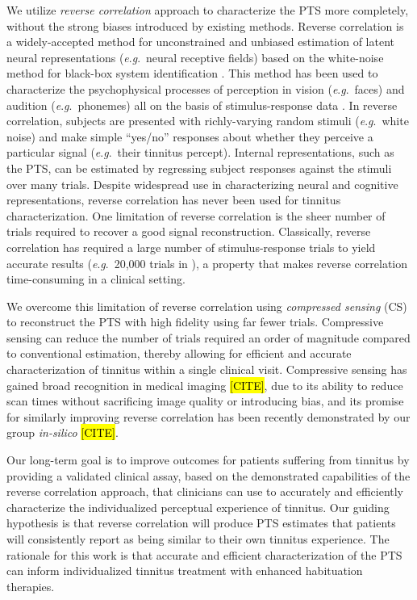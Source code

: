 \documentclass[journal]{IEEEtran}
\newcommand{\eg}{\textit{e}.\textit{g}.\ }
\begin{document}
We utilize \textit{reverse correlation} approach to characterize the PTS more completely,
without the strong biases introduced by existing methods.
Reverse correlation is a widely-accepted method for unconstrained and unbiased estimation
of latent neural representations (\eg neural receptive fields)
based on the white-noise method for black-box system identification
\cite{ringachReverseCorrelationNeurophysiology2004,ljungMeasureLackFit1978}.
This method has been used to characterize the psychophysical processes of perception
in vision (\eg faces) and audition (\eg phonemes)
\cite{ahumadaStimulusFeaturesSignal1971,gosselinSuperstitiousPerceptionsReveal2003,brimijoinInternalRepresentationVowel2013}
all on the basis of stimulus-response data
\cite{marmarelisWhiteNoiseMethodSystem1978,neriReceptivePerceptiveFields2006}.
In reverse correlation, subjects are presented with richly-varying random stimuli (\eg white noise)
and make simple ``yes/no'' responses about whether they perceive a particular signal
(\eg their tinnitus percept).
Internal representations, such as the PTS, can be estimated
by regressing subject responses against the stimuli over many trials.
Despite widespread use in characterizing neural and cognitive representations,
reverse correlation has never been used for tinnitus characterization.
One limitation of reverse correlation is the sheer number of trials
required to recover a good signal reconstruction.
Classically, reverse correlation has required a large number of stimulus-response trials
to yield accurate results (\eg 20,000 trials in \cite{gosselinSuperstitiousPerceptionsReveal2003}),
a property that makes reverse correlation time-consuming in a clinical setting.

We overcome this limitation of reverse correlation using \textit{compressed sensing} (CS)
to reconstruct the PTS with high fidelity using far fewer trials.
Compressive sensing can reduce the number of trials
required an order of magnitude compared to conventional estimation, thereby allowing for efficient and
accurate characterization of tinnitus within a single clinical visit. Compressive sensing has gained broad
recognition in medical imaging \hl{[CITE]}, due to its ability to reduce scan times without sacrificing image quality or
introducing bias, and its promise for similarly improving reverse correlation has been recently demonstrated by
our group \textit{in-silico} \hl{[CITE]}.

Our long-term goal is to improve outcomes for patients suffering from tinnitus by providing a validated
clinical assay, based on the demonstrated capabilities of the reverse correlation approach, that clinicians can
use to accurately and efficiently characterize the individualized perceptual experience of tinnitus. Our guiding
hypothesis is that reverse correlation will produce PTS estimates that patients will consistently report as being
similar to their own tinnitus experience. The rationale for this work is that accurate and efficient characterization
of the PTS can inform individualized tinnitus treatment with enhanced habituation therapies.
\end{document}
